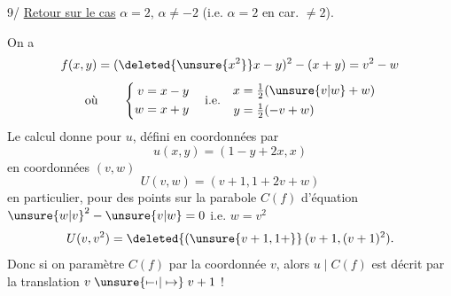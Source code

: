 9/ \uline{Retour sur le cas} $\alpha=2$, $\alpha\ne-2$ (i.e. $\alpha=2$ en car. $\ne2$).

On a
\[
f(x,y)=(\deleted{\unsure{x^2}}x-y)^2-(x+y)=v^2-w
\]
\[
\text{où}\qquad
\left\{\begin{aligned}v&=x-y\\w&=x+y\end{aligned}\right.
\quad\text{i.e.}\quad
\begin{aligned}x&=\tfrac12(\unsure{v|w}+w)\\y&=\tfrac12(-v+w)\end{aligned}
\]
Le calcul donne pour $u$, défini en coordonnées  par
\[
u(x,y)=(1-y+2x,x)
\]
en coordonnées $(v,w)$
\[
U(v,w)=(v+1,1+2v+w)
\]
en particulier, pour des points sur la parabole $C(f)$ d'équation ${\unsure{w|v}}^2-\unsure{v|w}=0$ i.e. $w=v^2$
\[
U(v,v^2)=\deleted{(\unsure{v+1,1+}}\,(v+1,(v+1)^2).
\]
Donc si on paramètre $C(f)$ par la coordonnée $v$, alors $u\mid C(f)$ est décrit par la translation $v\mathrel{\unsure{\mapstochar\relbar\mapstochar|\mapsto}}v+1$ !
